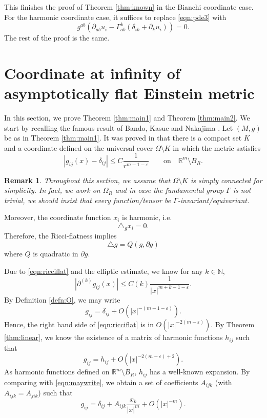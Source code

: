 \documentclass{amsart}
\newtheorem{rem}[thm]{Remark}
\newcommand{\abs}[1]{\left\vert#1\right\vert}
\newcommand{\Real}{\mathbb R}
\numberwithin{equation}{section}
\begin{document}
This finishes the proof of Theorem \ref{thm:known} in the Bianchi coordinate case.  For the harmonic coordinate case, it suffices to replace \eqref{eqn:pde3} with 
\[
	g^{ab} \left(\partial_{ab} u_i - \Gamma^k_{ab}(\delta_{ik} + \partial_k u_i) \right)	=0.
\]
The rest of the proof is the same.


\section{Coordinate at infinity of asymptotically flat Einstein metric}
\label{sec:infinity}

In this section, we prove Theorem \ref{thm:main1} and Theorem \ref{thm:main2}. We start by recalling the famous result of Bando, Kasue and Nakajima \cite{bando1989on}. Let $(M,g)$ be as in Theorem \ref{thm:main1}. It was proved in \cite{bando1989on} that there is a compact set $K$ and a coordinate defined on the universal cover $\Omega\setminus K$ in which the metric satisfies
\[
	\abs{g_{ij}(x)-\delta_{ij}} \leq C\frac{1}{r^{m-1-\varepsilon}} \qquad \text{on} \quad \Real^m\setminus B_R.
\]
\begin{rem}
	Throughout this section, we assume that $\Omega\setminus K$ is simply connected for simplicity. In fact, we work on $\Omega_R$ and in case the fundamental group $\Gamma$ is not trivial, we should insist that every function/tensor be $\Gamma$-invariant/equivariant.
\end{rem}
Moreover, the coordinate function $x_i$ is harmonic, i.e.
\[
	\triangle_g x_i =0.
\]
Therefore, the Ricci-flatness implies
\begin{equation}
	\label{eqn:ricciflat}
	\triangle g =Q(g,\partial g)
\end{equation}
where $Q$ is quadratic in $\partial g$.

Due to \eqref{eqn:ricciflat} and the elliptic estimate, we know for any $k\in \mathbb N$,
\[
	\abs{ \partial^{(k)} g_{ij}(x)} \leq C(k) \frac{1}{\abs{x}^{m+k-1-\varepsilon}}.
\]
By Definition \ref{defn:O}, we may write
\begin{equation}
	\label{eqn:maywrite}
	g_{ij}=\delta_{ij}+ O(\abs{x}^{-(m-1-\varepsilon)}).
\end{equation}
Hence, the right hand side of \eqref{eqn:ricciflat} is in $O(\abs{x}^{-2(m-\varepsilon)})$. By Theorem \ref{thm:linear}, we know the existence of a matrix of harmonic functions $h_{ij}$ such that
\[
	g_{ij}=h_{ij}+ O(\abs{x}^{-2(m-\varepsilon)+2}).
\]
As harmonic functions defined on $\Real^m\setminus B_R$, $h_{ij}$ has a well-known expansion. By comparing with \eqref{eqn:maywrite}, we obtain a set of coefficients $A_{ijk}$ (with $A_{ijk}=A_{jik}$) such that
\begin{equation}
	\label{eqn:gpre1}
	g_{ij}=\delta_{ij}+A_{ijk}\frac{x_k}{\abs{x}^{m}} + O(\abs{x}^{-m}).
\end{equation}
\end{document}
